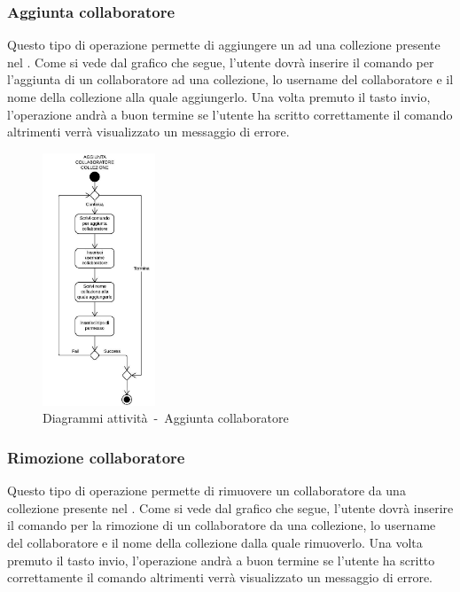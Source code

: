 \documentclass{scalatekids-article}
\begin{document}
\subsubsection{Aggiunta collaboratore}

Questo tipo di operazione permette di aggiungere un  ad
una collezione presente nel . Come si vede dal grafico che segue,
l'utente dovrà inserire il comando per l'aggiunta di un collaboratore ad una
collezione, lo username del collaboratore e il nome della collezione alla
quale aggiungerlo. Una volta premuto il tasto invio, l'operazione andrà a buon
termine se l'utente ha scritto correttamente il comando altrimenti verrà
visualizzato un messaggio di errore.

\begin{figure}[H]
  \begin{center}
    \includegraphics[width=0.3\textwidth, keepaspectratio]{img/diagrammiAttivita/aggCollaboratore.jpeg}
    \caption{Diagrammi attività\ -\ Aggiunta collaboratore}
  \end{center}
\end{figure}

\subsubsection{Rimozione collaboratore}

Questo tipo di operazione permette di rimuovere un collaboratore da una
collezione presente nel . Come si vede dal grafico che segue, l'utente
dovrà inserire il comando per la rimozione di un collaboratore da una
collezione, lo username del collaboratore e il nome della collezione dalla
quale rimuoverlo. Una volta premuto il tasto invio, l'operazione andrà a buon
termine se l'utente ha scritto correttamente il comando altrimenti verrà
visualizzato un messaggio di errore.
\end{document}
